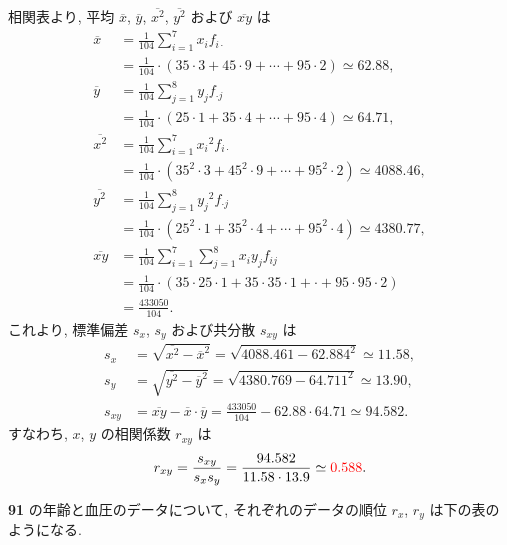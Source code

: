 \vspace{\baselineskip}
\plus
\begin{qenumerate}
	\item{
		相関表より, 平均 $\overline{x}$, $\overline{y}$, $\overline{x^{2}}$, $\overline{y^{2}}$ および $\overline{xy}$ は
		\begin{align}
			\overline{x} &= \frac{1}{104}\sum_{i = 1}^{7}{x_{i}f_{i\cdot}} \\
				&= \frac{1}{104}\cdot (35\cdot 3 + 45\cdot 9 + \cdots + 95\cdot 2) \simeq 62.88, \\
			\overline{y} &= \frac{1}{104}\sum_{j = 1}^{8}{y_{j}f_{\cdot j}} \\
				&= \frac{1}{104}\cdot (25\cdot 1 + 35\cdot 4 + \cdots + 95\cdot 4) \simeq 64.71, \\
			\overline{x^{2}} &= \frac{1}{104}\sum_{i = 1}^{7}{{x_{i}}^{2}f_{i\cdot}} \\
				&= \frac{1}{104}\cdot (35^{2}\cdot 3 + 45^{2}\cdot 9 + \cdots + 95^{2}\cdot 2) \simeq 4088.46, \\
			\overline{y^{2}} &= \frac{1}{104}\sum_{j = 1}^{8}{{y_{j}}^{2}f_{\cdot j}} \\
				&= \frac{1}{104}\cdot (25^{2}\cdot 1 + 35^{2}\cdot 4 + \cdots + 95^{2}\cdot 4) \simeq 4380.77, \\
			\overline{xy} &= \frac{1}{104}\sum_{i = 1}^{7}{\sum_{j = 1}^{8}{x_{i}y_{j}f_{ij}}} \\
				&= \frac{1}{104}\cdot (35\cdot 25\cdot 1 + 35\cdot 35\cdot 1 + \cdot + 95\cdot 95\cdot 2) \\
				&= \frac{433050}{104}.
		\end{align}
		これより, 標準偏差 $s_{x}$, $s_{y}$ および共分散 $s_{xy}$ は
		\begin{align}
			s_{x} &= \sqrt{\overline{x^{2}} - {\overline{x}}^{2}} = \sqrt{4088.461 - 62.884^{2}} \simeq 11.58, \\
			s_{y} &= \sqrt{\overline{y^{2}} - {\overline{y}}^{2}} = \sqrt{4380.769 - 64.711^{2}} \simeq 13.90, \\
			s_{xy} &= \overline{xy} - \overline{x}\cdot \overline{y} = \frac{433050}{104} - 62.88\cdot 64.71 \simeq 94.582.
		\end{align}
		すなわち, $x$, $y$ の相関係数 $r_{xy}$ は
		\begin{align}
			r_{xy} = \frac{s_{xy}}{s_{x}s_{y}} = \frac{94.582}{11.58\cdot 13.9} \simeq \textcolor{red}{0.588}.
		\end{align}
	}
	\item{
		{\textbf{91}} の年齢と血圧のデータについて, それぞれのデータの順位 $r_{x}$, $r_{y}$ は下の表のようになる.
}
\end{qenumerate}
